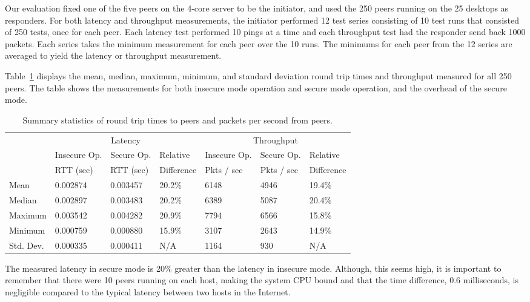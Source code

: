 \documentclass[11pt]{article}
\begin{document}
Our evaluation fixed one of the five peers on the 4-core server to
be the initiator, and used the 250 peers running on the 25 desktops
as responders.  For both latency and throughput measurements, the
initiator performed 12 test series consisting of 10 test runs that
consisted of 250 tests, once for each peer.  Each latency test
performed 10 pings at a time and each throughput test had the
responder send back 1000 packets.  Each series takes the minimum
measurement for each peer over the 10 runs.  The minimums for each
peer from the 12 series are averaged to yield the latency or
throughput measurement.

Table~\ref{tab:summary} displays the mean, median, maximum, minimum,
and standard deviation round trip times and throughput measured
for all 250 peers.  The table shows the measurements for both
insecure mode operation and secure mode operation, and the overhead
of the secure mode.

\begin{table}[htb]
\begin{center}
\begin{tabular}{|l|l|l|l||l|l|l|}
\cline{2-7} 
\multicolumn{1}{c}{\ }
& \multicolumn{3}{|c||}{Latency} & \multicolumn{3}{|c|}{Throughput} \\
\cline{2-7} 
\multicolumn{1}{c|}{\ }
& Insecure Op. & Secure Op. & Relative & Insecure Op. & Secure Op. & Relative \\
\multicolumn{1}{c|}{\ }
& RTT (sec) & RTT (sec) & Difference & Pkts / sec & Pkts / sec & Difference \\
\hline
Mean    & 0.002874 & 0.003457 & 20.2\% & 6148 & 4946 & 19.4\% \\
Median  & 0.002897 & 0.003483 & 20.2\% & 6389 & 5087 & 20.4\% \\
Maximum & 0.003542 & 0.004282 & 20.9\% & 7794 & 6566 & 15.8\% \\
Minimum & 0.000759 & 0.000880 & 15.9\% & 3107 & 2643 & 14.9\% \\
Std. Dev.   & 0.000335 & 0.000411 & N/A    & 1164 & 930 & N/A \\
\hline
\end{tabular}
  \caption{Summary statistics of round trip times to peers and packets per 
           second from peers.\label{tab:summary}}
\end{center}
\end{table}

The measured latency in secure mode is 20\% greater than the latency
in insecure mode.  Although, this seems high, it is important to
remember that there were 10 peers running on each host, making the
system CPU bound and that the time difference, 0.6 milliseconds, is negligible
compared to the typical latency between two hosts in the Internet.
\end{document}
